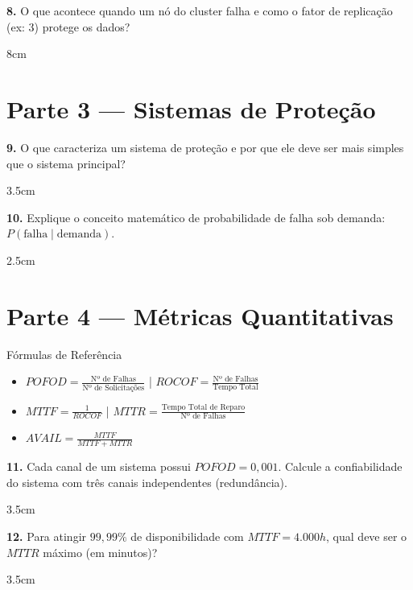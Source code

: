 \documentclass[12pt]{article}
\begin{document}
  \textbf{8.} O que acontece quando um nó do cluster falha e como o fator de replicação (ex: 3) protege os dados?
  \begin{resposta}{8cm}
  \end{resposta}

  \section*{Parte 3 — Sistemas de Proteção}

  \textbf{9.} O que caracteriza um sistema de proteção e por que ele deve ser mais simples que o sistema principal?
  \begin{resposta}{3.5cm}
  \end{resposta}

  \textbf{10.} Explique o conceito matemático de probabilidade de falha sob demanda: $P(\text{falha} \mid \text{demanda})$.
  \begin{resposta}{2.5cm}
  \end{resposta}

  \newpage

  \section*{Parte 4 — Métricas Quantitativas}

  \begin{block}{Fórmulas de Referência}
      \small
      \begin{itemize}
          \item $POFOD = \frac{\text{Nº de Falhas}}{\text{Nº de Solicitações}}$ \quad | \quad $ROCOF = \frac{\text{Nº de Falhas}}{\text{Tempo Total}}$
          \item $MTTF = \frac{1}{ROCOF}$ \quad | \quad $MTTR = \frac{\text{Tempo Total de Reparo}}{\text{Nº de Falhas}}$
          \item $AVAIL = \frac{MTTF}{MTTF + MTTR}$
      \end{itemize}
  \end{block}

  \textbf{11.} Cada canal de um sistema possui $POFOD = 0,001$. Calcule a confiabilidade do sistema com três canais independentes (redundância).
  \begin{resposta}{3.5cm}
  \end{resposta}

  \textbf{12.} Para atingir $99,99\%$ de disponibilidade com $MTTF = 4.000h$, qual deve ser o $MTTR$ máximo (em minutos)?
  \begin{resposta}{3.5cm}
  \end{resposta}
\end{document}
